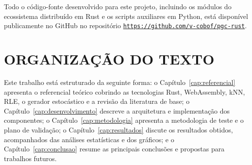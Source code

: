 \documentclass[
	12pt,
	openright,
	oneside,
	a4paper,
	english,
	brazil
	]{abntex2}
\begin{document}
\begin{table}[H]
\centering
\caption{Disciplinas do BCC/UFABC e sua contribuição ao projeto}
\label{tab:disciplinas}
\end{table}

Todo o código-fonte desenvolvido para este projeto, incluindo os módulos do ecossistema distribuído em Rust e os scripts auxiliares em Python, está disponível publicamente no GitHub no repositório \href{https://github.com/v-cobof/pgc-rust}{\texttt{https://github.com/v-cobof/pgc-rust}}.

\section{ORGANIZAÇÃO DO TEXTO}

Este trabalho está estruturado da seguinte forma: o Capítulo~\ref{cap:referencial} apresenta o referencial teórico cobrindo as tecnologias Rust, WebAssembly, kNN, RLE, o gerador estocástico e a revisão da literatura de base; o Capítulo~\ref{cap:desenvolvimento} descreve a arquitetura e implementação dos componentes; o Capítulo~\ref{cap:metodologia} apresenta a metodologia de teste e o plano de validação; o Capítulo~\ref{cap:resultados} discute os resultados obtidos, acompanhados das análises estatísticas e dos gráficos; e o Capítulo~\ref{cap:conclusao} resume as principais conclusões e propostas para trabalhos futuros.
\end{document}
